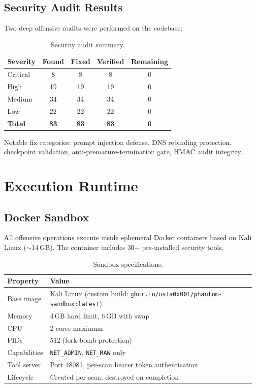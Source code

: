 \documentclass[12pt,a4paper]{report}
\begin{document}
\section{Security Audit Results}

Two deep offensive audits were performed on the codebase:

\begin{table}[H]
\centering
\caption{Security audit summary.}
\begin{tabular}{lcccc}
\toprule
\textbf{Severity} & \textbf{Found} & \textbf{Fixed} & \textbf{Verified} & \textbf{Remaining} \\
\midrule
Critical & 8 & 8 & 8 & 0 \\
High     & 19 & 19 & 19 & 0 \\
Medium   & 34 & 34 & 34 & 0 \\
Low      & 22 & 22 & 22 & 0 \\
\midrule
\textbf{Total} & \textbf{83} & \textbf{83} & \textbf{83} & \textbf{0} \\
\bottomrule
\end{tabular}
\end{table}

Notable fix categories: prompt injection defense, DNS rebinding protection, checkpoint validation, anti-premature-termination gate, HMAC audit integrity.


\chapter{Execution Runtime}

\section{Docker Sandbox}

All offensive operations execute inside ephemeral Docker containers based on Kali Linux ($\sim$14\,GB). The container includes 30+ pre-installed security tools.

\begin{table}[H]
\centering
\caption{Sandbox specifications.}
\begin{tabularx}{\textwidth}{lX}
\toprule
\textbf{Property} & \textbf{Value} \\
\midrule
Base image       & Kali Linux (custom build: \texttt{ghcr.io/usta0x001/phantom-sandbox:latest}) \\
Memory           & 4\,GB hard limit, 6\,GB with swap \\
CPU              & 2 cores maximum \\
PIDs             & 512 (fork-bomb protection) \\
Capabilities     & \texttt{NET\_ADMIN}, \texttt{NET\_RAW} only \\
Tool server      & Port 48081, per-scan bearer token authentication \\
Lifecycle        & Created per-scan, destroyed on completion \\
\bottomrule
\end{tabularx}
\end{table}
\end{document}
